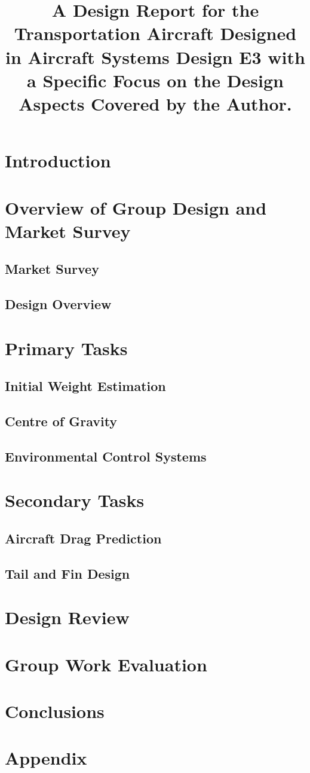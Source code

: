 \documentclass[stu, a4paper, 12pt, floatsintext]{apa7}
\title{A Design Report for the Transportation Aircraft Designed in Aircraft Systems Design E3 with a Specific Focus on the Design Aspects Covered by the Author.}
\numberwithin{figure}{section}
\numberwithin{table}{section}
\numberwithin{equation}{section}
\begin{document}
\maketitle{} %

\tableofcontents

\newpage

\listoffigures
{}
\listoftables
{}
\listofmyequations

\newpage

\section{Introduction}
\section{Overview of Group Design and Market Survey}
\subsection{Market Survey}
\subsection{Design Overview}
\section{Primary Tasks}
\subsection{Initial Weight Estimation}
\subsection{Centre of Gravity}
\subsection{Environmental Control Systems}
\section{Secondary Tasks}
\subsection{Aircraft Drag Prediction}
\subsection{Tail and Fin Design}
\section{Design Review}
\section{Group Work Evaluation}
\section{Conclusions}

\section{Appendix}

\printbibliography
\end{document}
